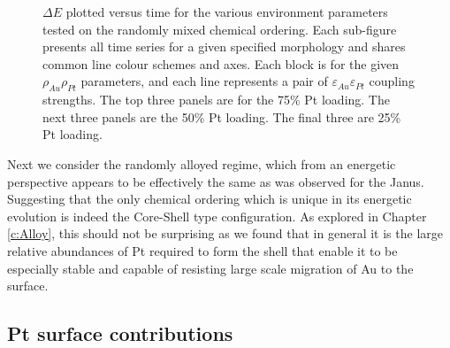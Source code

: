 \begin{figure}
\begin{subfigure}[b]{0.8\textwidth}
\end{subfigure}
    \caption{$\Delta E$ plotted versus time for the various environment parameters tested on the randomly mixed chemical ordering. Each sub-figure presents all time series for a given specified morphology and shares common line colour schemes and axes. Each block is for the given $\rho_{Au}\rho_{Pt}$ parameters, and each line represents a pair of $\varepsilon_{Au}\varepsilon_{Pt}$ coupling strengths. The top three panels are for the 75\% Pt loading. The next three panels are the 50\% Pt loading. The final three are 25\% Pt loading.}
    \label{fig:Delta_E_Env_rnd25}
\end{figure}

Next we consider the randomly alloyed regime, which from an energetic perspective appears to be effectively the same as was observed for the Janus. Suggesting that the only chemical ordering which is unique in its energetic evolution is indeed the Core-Shell type configuration. As explored in Chapter \ref{c:Alloy}, this should not be surprising as we found that in general it is the large relative abundances of Pt required to form the shell that enable it to be especially stable and capable of resisting large scale migration of Au to the surface.

\subsection{Pt surface contributions}

